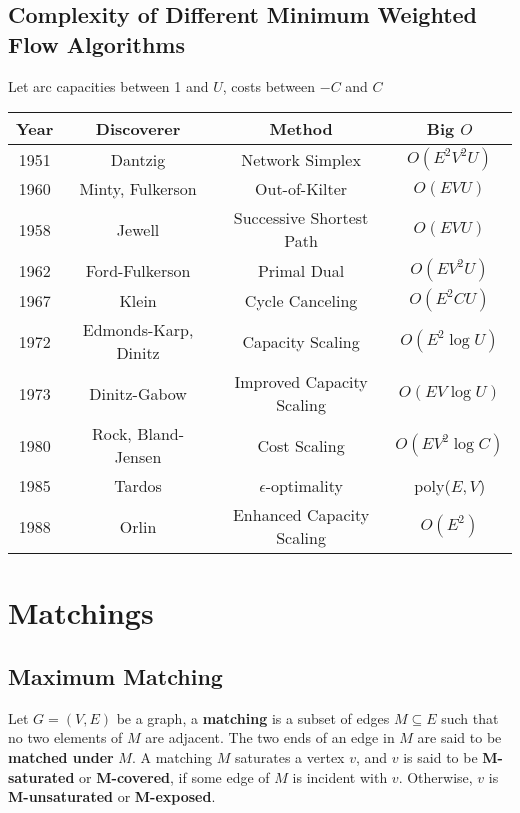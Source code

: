 		\section{Complexity of Different Minimum Weighted Flow Algorithms}
			Let arc capacities between 1 and $U$, costs between $-C$ and $C$
			\begin{table*}[ht]
				\centering
				\begin{tabular} {|c|c|c|c|}
					\hline
					Year & Discoverer & Method & Big $O$ \\
					\hline
					1951 & Dantzig & Network Simplex & $O(E^2V^2U)$ \\
					1960 & Minty, Fulkerson & Out-of-Kilter & $O(EVU)$\\
					1958 & Jewell & Successive Shortest Path & $O(EVU)$ \\
					1962 & Ford-Fulkerson & Primal Dual & $O(EV^2U)$ \\
					1967 & Klein & Cycle Canceling & $O(E^2CU)$ \\
					1972 & Edmonds-Karp, Dinitz & Capacity Scaling & $O(E^2 \log U)$\\
					1973 & Dinitz-Gabow & Improved Capacity Scaling & $O(EV\log U)$ \\
					1980 & Rock, Bland-Jensen & Cost Scaling & $O(EV^2\log C)$\\
					1985 & Tardos & $\epsilon$-optimality & poly($E,V$)\\
					1988 & Orlin & Enhanced Capacity Scaling & $O(E^2)$ \\
					\hline
				\end{tabular}
			\end{table*}

	\chapter{Matchings}
		\section{Maximum Matching}
			\begin{definition}[Matching]
				Let $G = (V, E)$ be a graph, a \textbf{matching} is a subset of edges $M \subseteq E$ such that no two elements of $M$ are adjacent. The two ends of an edge in $M$ are said to be \textbf{matched under} $M$. A matching $M$ saturates a vertex $v$, and $v$ is said to be \textbf{M-saturated} or \textbf{M-covered}, if some edge of $M$ is incident with $v$. Otherwise, $v$ is \textbf{M-unsaturated} or \textbf{M-exposed}.
			\end{definition}

